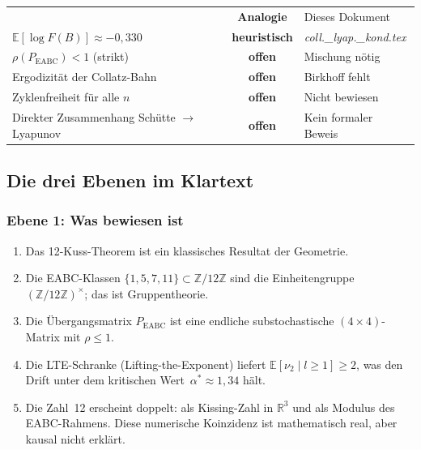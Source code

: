 \documentclass[12pt,a4paper]{article}
\newcommand{\vii}{\nu_2}
\newcommand{\Z}{\mathbb{Z}}
\newcommand{\R}{\mathbb{R}}
\newcommand{\E}{\mathbb{E}}
\newcommand{\logF}{\log F(B)}
\newcommand{\ZmZ}{\Z/12\Z}
\begin{document}
\begin{table}[h!]
\begin{tabular}{p{7.5cm} c p{4cm}}
  & \textcolor{warnorange}{\textbf{Analogie}}
  & Dieses Dokument \\
$\E[\logF] \approx -0{,}330$
  & \textcolor{warnorange}{\textbf{heuristisch}}
  & \textit{coll.\_lyap.\_kond.tex} \\
\midrule
$\rho(P_{\text{EABC}}) < 1$ (strikt)
  & \textcolor{lückenrot}{\textbf{offen}}
  & Mischung nötig \\
Ergodizität der Collatz-Bahn
  & \textcolor{lückenrot}{\textbf{offen}}
  & Birkhoff fehlt \\
Zyklenfreiheit für alle $n$
  & \textcolor{lückenrot}{\textbf{offen}}
  & Nicht bewiesen \\
Direkter Zusammenhang Schütte $\to$ Lyapunov
  & \textcolor{lückenrot}{\textbf{offen}}
  & Kein formaler Beweis \\
\bottomrule
\end{tabular}
\end{table}

\subsection{Die drei Ebenen im Klartext}

\subsubsection{Ebene 1: Was bewiesen ist}

\begin{tcolorbox}[ergebnis, title={Beweisbare Aussagen}]
\begin{enumerate}[noitemsep]
  \item Das 12-Kuss-Theorem ist ein klassisches Resultat der Geometrie.
  \item Die EABC-Klassen $\{1, 5, 7, 11\} \subset \ZmZ$ sind die
        Einheitengruppe $(\Z/12\Z)^\times$; das ist Gruppentheorie.
  \item Die Übergangsmatrix $P_{\text{EABC}}$ ist eine endliche
        substochastische $(4 \times 4)$-Matrix mit $\rho \leq 1$.
  \item Die LTE-Schranke (Lifting-the-Exponent) liefert
        $\E[\vii \mid l \geq 1] \geq 2$, was den Drift unter dem
        kritischen Wert~$\alpha^* \approx 1{,}34$ hält.
  \item Die Zahl~12 erscheint doppelt: als Kissing-Zahl in $\R^3$
        und als Modulus des EABC-Rahmens. Diese numerische Koinzidenz
        ist mathematisch real, aber kausal nicht erklärt.
\end{enumerate}
\end{tcolorbox}
\end{document}
